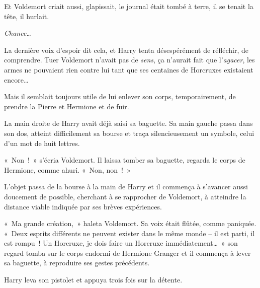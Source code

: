 Et Voldemort criait aussi, glapissait, le journal était tombé à terre, il se tenait la tête, il hurlait.

\emph{Chance…}

La dernière voix d'espoir dit cela, et Harry tenta désespérément de réfléchir, de comprendre.
Tuer Voldemort n'avait pas de \emph{sens}, ça n'aurait fait que l'\emph{agacer}, les armes ne pouvaient rien contre lui tant que ses centaines de Horcruxes existaient encore…

Mais il semblait toujours utile de lui enlever son corps, temporairement, de prendre la Pierre et Hermione et de fuir.

La main droite de Harry avait déjà saisi sa baguette.
Sa main gauche passa dans son dos, atteint difficilement sa bourse et traça silencieusement un symbole, celui d'un mot de huit lettres.

«~Non~!~» s'écria Voldemort.
Il laissa tomber sa baguette, regarda le corps de Hermione, comme ahuri.
«~Non, non~!~»

L'objet passa de la bourse à la main de Harry et il commença à s'avancer aussi doucement de possible, cherchant à se rapprocher de Voldemort, à atteindre la distance viable indiquée par ses brèves expériences.

«~Ma grande création,~» haleta Voldemort.
Sa voix était flûtée, comme paniquée.
«~Deux esprits différents ne peuvent exister dans le même monde -- il est parti, il est rompu~!
Un Horcruxe, je dois faire un Horcruxe immédiatement…~»
son regard tomba sur le corps endormi de Hermione Granger et il commença à lever sa baguette, à reproduire ses gestes précédents.

Harry leva son pistolet et appuya trois fois sur la détente.
